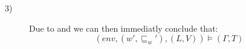 \begin{description}
\item[3)] Due to  and  we can then immediatly conclude that:
	$$(env,(w',\sqsubseteq_w'),(L,V))\models(\Gamma,T)$$
\end{description}
